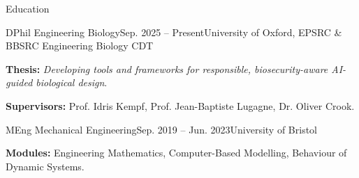
\begin{rSection}{Education}

    \begin{rSubsection}{DPhil Engineering Biology}{Sep. 2025 -- Present}{University of Oxford, EPSRC \& BBSRC Engineering Biology CDT}{}
        \item \textbf{Thesis:} \textit{Developing tools and frameworks for responsible, biosecurity-aware AI-guided biological \mbox{design}}.
        \item \textbf{Supervisors:} Prof. Idris Kempf, Prof. Jean-Baptiste Lugagne, Dr. Oliver Crook.
    \end{rSubsection}

    \begin{rSubsection}{MEng Mechanical Engineering}{Sep. 2019 -- Jun. 2023}{University of Bristol}{}
        \item \textbf{Modules:} Engineering Mathematics, Computer-Based Modelling, Behaviour of Dynamic Systems.
    \end{rSubsection}

\end{rSection}
